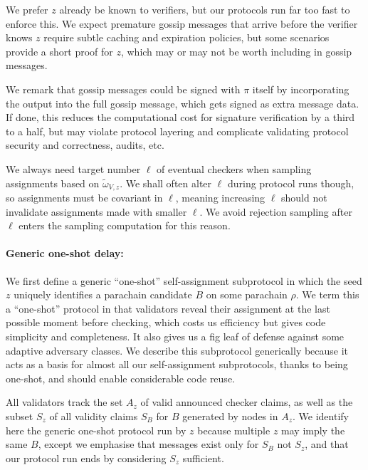 We prefer $z$ already be known to verifiers, but our protocols run far too fast to enforce this.  We expect premature gossip messages that arrive before the verifier knows $z$ require subtle caching and expiration policies, but some scenarios provide a short proof for $z$, which may or may not be worth including in gossip messages.

We remark that gossip messages could be signed with $\pi$ itself by incorporating the output into the full gossip message, which gets signed as extra message data.  If done, this reduces the computational cost for signature verification by a third to a half, but may violate protocol layering and complicate validating protocol security and correctness, audits, etc. 

We always need target number $\ell$ of eventual checkers when sampling assignments based on $\tilde{\omega}_{V,z}$.  We shall often alter $\ell$ during protocol runs though, so assignments must be covariant in $\ell$, meaning increasing $\ell$ should not invalidate assignments made with smaller $\ell$.  We avoid rejection sampling after $\ell$ enters the sampling computation for this reason.

\paragraph{Generic one-shot delay:}

We first define a generic ``one-shot'' self-assignment subprotocol in which the seed $z$ uniquely identifies a parachain candidate $B$ on some parachain $\rho$.  We term this a ``one-shot'' protocol in that validators reveal their assignment at the last possible moment before checking, which costs us efficiency but gives code simplicity and completeness.  It also gives us a fig leaf of defense against some adaptive adversary classes.  We describe this subprotocol generically because it acts as a basis for almost all our self-assignment subprotocols, thanks to being one-shot, and should enable considerable code reuse.  

All validators track the set $A_z$ of valid announced checker claims, as well as the subset $S_z$ of all validity claims $S_B$ for $B$ generated by nodes in $A_z$.  We identify here the generic one-shot protocol run by $z$ because multiple $z$ may imply the same $B$, except we emphasise that messages exist only for $S_B$ not $S_z$, and that our protocol run ends by considering $S_z$ sufficient.  

